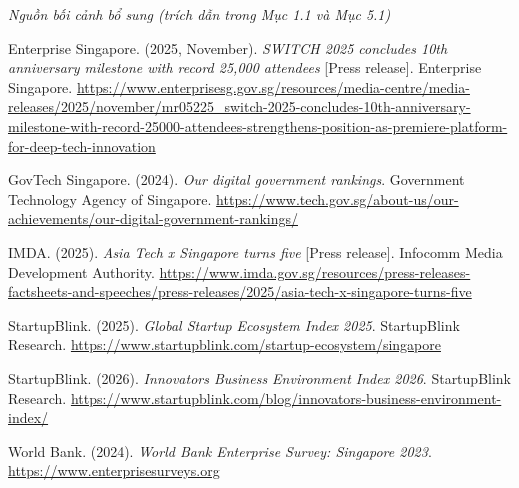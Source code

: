\documentclass[12pt,a4paper]{article}
\begin{document}
\emph{Nguồn bối cảnh bổ sung (trích dẫn trong Mục 1.1 và Mục 5.1)}

Enterprise Singapore. (2025, November). \emph{SWITCH 2025 concludes 10th
anniversary milestone with record 25,000 attendees} {[}Press release{]}.
Enterprise Singapore.
\url{https://www.enterprisesg.gov.sg/resources/media-centre/media-releases/2025/november/mr05225_switch-2025-concludes-10th-anniversary-milestone-with-record-25000-attendees-strengthens-position-as-premiere-platform-for-deep-tech-innovation}

GovTech Singapore. (2024). \emph{Our digital government rankings}.
Government Technology Agency of Singapore.
\url{https://www.tech.gov.sg/about-us/our-achievements/our-digital-government-rankings/}

IMDA. (2025). \emph{Asia Tech x Singapore turns five} {[}Press
release{]}. Infocomm Media Development Authority.
\url{https://www.imda.gov.sg/resources/press-releases-factsheets-and-speeches/press-releases/2025/asia-tech-x-singapore-turns-five}

StartupBlink. (2025). \emph{Global Startup Ecosystem Index 2025}.
StartupBlink Research.
\url{https://www.startupblink.com/startup-ecosystem/singapore}

StartupBlink. (2026). \emph{Innovators Business Environment Index 2026}.
StartupBlink Research.
\url{https://www.startupblink.com/blog/innovators-business-environment-index/}

World Bank. (2024). \emph{World Bank Enterprise Survey: Singapore 2023}.
\url{https://www.enterprisesurveys.org}
\end{document}
